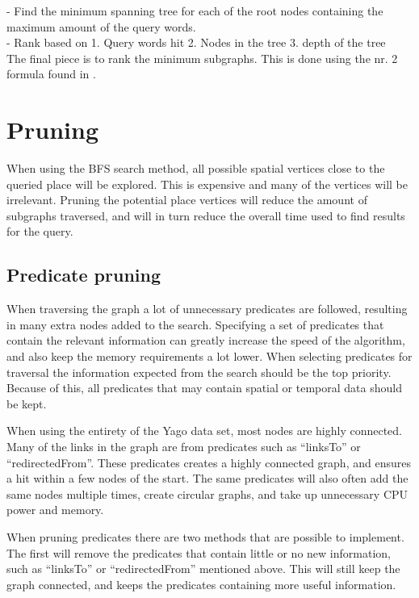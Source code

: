 - Find the minimum spanning tree for each of the root nodes containing the maximum amount of the query words.\\
- Rank based on 1. Query words hit 2. Nodes in the tree 3. depth of the tree\\
The final piece is to rank the minimum subgraphs. This is done using the nr. 2 formula found in \cite{Shi:2016:TRS:2882903.2882941}. 


\section{Pruning} \label{pruning}
When using the BFS search method, all possible spatial vertices close to the queried place will be explored. This is expensive and many of the vertices will be irrelevant. Pruning the potential place vertices will reduce the amount of subgraphs traversed, and will in turn reduce the overall time used to find results for the query.

\subsection{Predicate pruning}
When traversing the graph a lot of unnecessary predicates are followed, resulting in many extra nodes added to the search. Specifying a set of predicates that contain the relevant information can greatly increase the speed of the algorithm, and also keep the memory requirements a lot lower. When selecting predicates for traversal the information expected from the search should be the top priority. Because of this, all predicates that may contain spatial or temporal data should be kept.

When using the entirety of the Yago data set, most nodes are highly connected. Many of the links in the graph are from predicates such as ``linksTo'' or ``redirectedFrom''. These predicates creates a highly connected graph, and ensures a hit within a few nodes of the start. The same predicates will also often add the same nodes multiple times, create circular graphs, and take up unnecessary CPU power and memory.

When pruning predicates there are two methods that are possible to implement. The first will remove the predicates that contain little or no new information, such as ``linksTo'' or ``redirectedFrom'' mentioned above. This will still keep the graph connected, and keeps the predicates containing more useful information.

